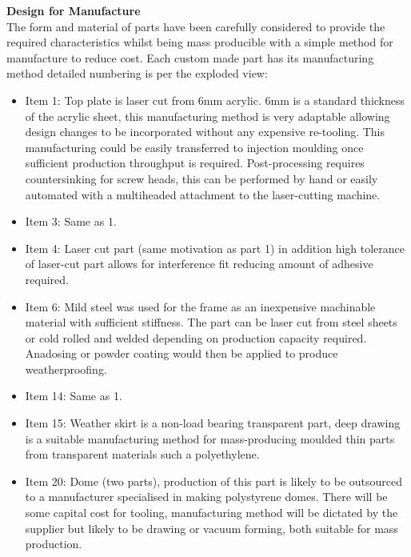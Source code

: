 

\textbf{Design for Manufacture}\\
The form and material of parts have been carefully considered to provide the required characteristics whilst being mass producible with a simple method for manufacture to reduce cost. Each custom made part has its manufacturing method detailed numbering is per the exploded view:
\begin{itemize}
\item Item 1: Top plate is laser cut from 6mm acrylic. 6mm is a standard thickness of the acrylic sheet, this manufacturing method is very adaptable allowing design changes to be incorporated without any expensive re-tooling. This manufacturing could be easily transferred to injection moulding once sufficient production throughput is required. Post-processing requires countersinking for screw heads, this can be performed by hand or easily automated with a multiheaded attachment to the laser-cutting machine.
\item Item 3: Same as 1.
\item Item 4: Laser cut part (same motivation as part 1) in addition high tolerance of laser-cut part allows for interference fit reducing amount of adhesive required.
\item Item 6: Mild steel was used for the frame as an inexpensive machinable material with sufficient stiffness. The part can be laser cut from steel sheets or cold rolled and welded depending on production capacity required. Anadosing or powder coating would then be applied to produce weatherproofing.
\item Item 14: Same as 1.
\item Item 15: Weather skirt is a non-load bearing transparent part, deep drawing is a suitable manufacturing method for mass-producing moulded thin parts from transparent materials such a polyethylene.
\item Item 20: Dome (two parts), production of this part is likely to be outsourced to a manufacturer specialised in making polystyrene domes. There will be some capital cost for tooling, manufacturing method will be dictated by the supplier but likely to be drawing or vacuum forming, both suitable for mass production.
\end{itemize}


